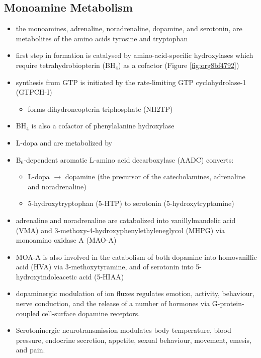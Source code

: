 \documentclass{scrartcl}
\begin{document}
\subsection{Monoamine Metabolism}
\label{sec:org6d88919}
\begin{itemize}
\item the monoamines, adrenaline, noradrenaline, dopamine, and serotonin,
are metabolites of the amino acids tyrosine and tryptophan
\item first step in formation is catalysed by amino-acid-specific
hydroxylases which require tetrahydrobiopterin (BH\(_{\text{4}}\)) as a cofactor
(Figure \ref{fig:org8bf4792})
\item synthesis from GTP is initiated by the rate-limiting GTP
cyclohydrolase-1 (GTPCH-I)
\begin{itemize}
\item forms dihydroneopterin triphosphate (NH2TP)
\end{itemize}
\item BH\(_{\text{4}}\) is also a cofactor of phenylalanine hydroxylase
\item L-dopa and  are metabolized by
\item B\(_{\text{6}}\)-dependent aromatic L-amino acid decarboxylase (AADC) converts:
\begin{itemize}
\item L-dopa \(\to\) dopamine (the precursor of the catecholamines, adrenaline and
noradrenaline)
\item 5-hydroxytryptophan (5-HTP) to serotonin (5-hydroxytryptamine)
\end{itemize}
\item adrenaline and noradrenaline are catabolized into vanillylmandelic
acid (VMA) and 3-methoxy-4-hydroxyphenylethyleneglycol (MHPG) via
monoamino oxidase A (MAO-A)
\item MOA-A is also involved in the catabolism of both dopamine into
homovanillic acid (HVA) via 3-methoxytyramine, and of serotonin into
5-hydroxyindoleacetic acid (5-HIAA)
\item dopaminergic modulation of ion fluxes regulates emotion, activity,
behaviour, nerve conduction, and the release of a number of hormones
via G-protein-coupled cell-surface dopamine
receptors.
\item Serotoninergic neurotransmission modulates body temperature, blood
pressure, endocrine secretion, appetite, sexual behaviour, movement,
emesis, and pain.
\end{itemize}
\end{document}
